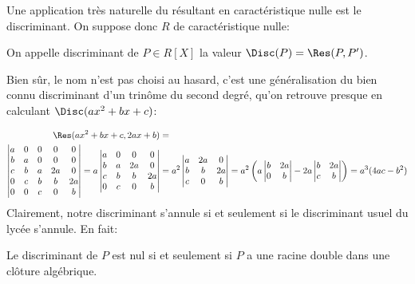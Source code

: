 \documentclass{article}
\begin{document}
Une application très naturelle du résultant en caractéristique nulle est le discriminant. On suppose donc $R$ de caractéristique nulle:

\begin{definition}
    On appelle discriminant de $P \in R[X]$ la valeur $\Disc(P) = \Res(P, P')$.
\end{definition}

Bien sûr, le nom n'est pas choisi au hasard, c'est une généralisation du bien connu discriminant d'un trinôme du second degré, qu'on retrouve presque en calculant $\Disc(ax^2 + bx + c)$:

\begin{align*}
    \Res(ax^2 + bx + c, 2ax + b) & =                   \\
    \begin{vmatrix}
        a & 0 & 0 & 0  & 0  \\
        b & a & 0 & 0  & 0  \\
        c & b & a & 2a & 0  \\
        0 & c & b & b  & 2a \\
        0 & 0 & c & 0  & b
    \end{vmatrix}
    = a\begin{vmatrix}
           a & 0 & 0  & 0  \\
           b & a & 2a & 0  \\
           c & b & b  & 2a \\
           0 & c & 0  & b
       \end{vmatrix}
                                 & = a^2\begin{vmatrix}
                                            a & 2a & 0  \\
                                            b & b  & 2a \\
                                            c & 0  & b
                                        \end{vmatrix}
    = a^2\left(a\begin{vmatrix}
                    b & 2a \\
                    0 & b
                \end{vmatrix} - 2a\begin{vmatrix}
                                      b & 2a \\
                                      c & b
                                  \end{vmatrix}\right)
    = a^3(4ac - b^2)
\end{align*}
Clairement, notre discriminant s'annule si et seulement si le discriminant usuel du lycée s'annule. En fait:
\begin{proposition}
    Le discriminant de $P$ est nul si et seulement si $P$ a une racine double dans une clôture algébrique.
\end{proposition}
\end{document}
